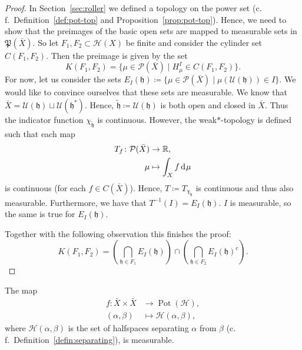 \begin{proof}
  In Section~\ref{sec:roller} we defined a topology on the power set (c.\,f.\ Definition~\ref{def:pot-top} and Proposition~\ref{prop:pot-top}). Hence, we need to show that the preimages of the basic open sets are mapped to measurable sets in \(\mathfrak{P}(\bar X)\). So let \(F_1, F_2 \subset \mathcal{H}(X)\) be finite and consider the cylinder set \(C(F_1, F_2)\). Then the preimage is given by the set
  \[
    K(F_1, F_2) = \{\mu \in \mathcal{P}(\bar X) \mid H^I_\mu \in C(F_1, F_2)\}.
  \]
  For now, let us consider the sets \(E_I(\mathfrak{h}) \coloneqq \{\mu \in \mathcal{P}(\bar X) \mid \mu(\mathcal{U}(\mathfrak{h})) \in I\}\). We would like to convince ourselves that these sets are measurable. We know that \(\bar X = \mathcal{U}(\mathfrak{h}) \sqcup \mathcal{U}(\mathfrak{h}^\ast)\). Hence, \(\mathfrak{\tilde h} \coloneqq \mathcal{U}(\mathfrak{h})\) is both open and closed in \(\bar X\). Thus the indicator function \(\chi_{\mathfrak{\tilde h}}\) is continuous. However, the weak\(\ast\)-topology is defined such that each map
  \begin{align*}
    T_f\colon \mathcal{P}(\bar X) &\to \R,\\
    \mu &\mapsto \int_X f \d\mu
  \end{align*}
  is continuous (for each \(f \in C(\bar X)\)). Hence, \(T \coloneqq T_{\chi_{\mathfrak{\tilde h}}}\) is continuous and thus also measurable. Furthermore, we have that \(T^{-1}(I) = E_I(\mathfrak{h})\). \(I\) is measurable, so the same is true for \(E_I(\mathfrak{h})\).

  Together with the following observation this finishes the proof:
  \[
    K(F_1, F_2) = \left (\bigcap_{\mathfrak{h} \in F_1} E_I(\mathfrak{h}) \right ) \cap \left ( \bigcap_{\mathfrak{h} \in F_2} E_I(\mathfrak{h})^{c}\right).
  \]
\end{proof}


\begin{lemma}
  The map
  \begin{align*}
    f\colon \bar X \times \bar X &\to \operatorname{Pot}(\mathcal{H}),\\
    (\alpha, \beta) &\mapsto \mathcal{H}(\alpha, \beta),
  \end{align*}
  where \(\mathcal{H}(\alpha, \beta)\) is the set of halfspaces separating \(\alpha\) from \(\beta\) (c.\,f.\ Definition~\ref{defin:separating}),  is measurable.
\end{lemma}

